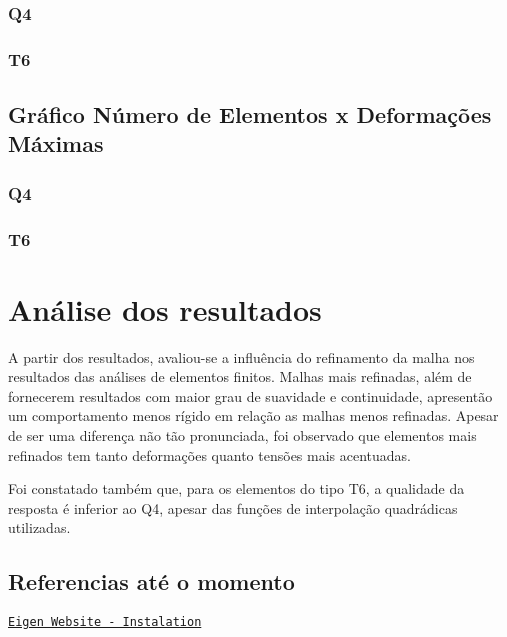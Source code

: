 \subsubsection*{Q4}

\subsubsection*{}

\subsubsection*{T6}

\subsubsection*{}

\subsection*{Gráfico Número de Elementos x Deformações Máximas}

\subsubsection*{Q4}

\subsubsection*{}

\subsubsection*{T6}

\subsubsection*{}

\section*{Análise dos resultados}


\begin{DoxyItemize}
\item A partir dos resultados, avaliou-\/se a influência do refinamento da malha nos resultados das análises de elementos finitos. Malhas mais refinadas, além de fornecerem resultados com maior grau de suavidade e continuidade, apresentão um comportamento menos rígido em relação as malhas menos refinadas. Apesar de ser uma diferença não tão pronunciada, foi observado que elementos mais refinados tem tanto deformações quanto tensões mais acentuadas.
\item Foi constatado também que, para os elementos do tipo T6, a qualidade da resposta é inferior ao Q4, apesar das funções de interpolação quadrádicas utilizadas.
\end{DoxyItemize}

\subsection*{Referencias até o momento}

\href{http://eigen.tuxfamily.org/index.php?title=IDEs#Visual_Studio}{\tt Eigen Website -\/ Instalation} 